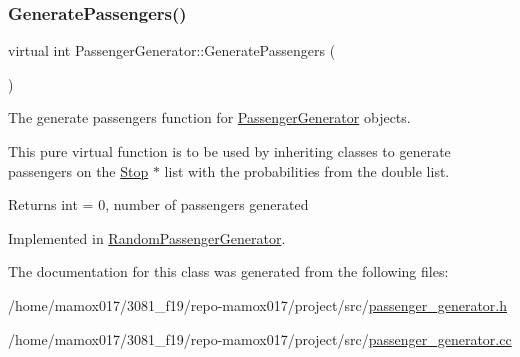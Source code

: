 \subsubsection{\texorpdfstring{Generate\+Passengers()}{GeneratePassengers()}}
{\footnotesize\ttfamily virtual int Passenger\+Generator\+::\+Generate\+Passengers (\begin{DoxyParamCaption}{ }\end{DoxyParamCaption})\hspace{0.3cm}{\ttfamily [pure virtual]}}



The generate passengers function for \hyperlink{classPassengerGenerator}{Passenger\+Generator} objects. 

This pure virtual function is to be used by inheriting classes to generate passengers on the \hyperlink{classStop}{Stop} $\ast$ list with the probabilities from the double list.

\begin{DoxyReturn}{Returns}
int = 0, number of passengers generated 
\end{DoxyReturn}


Implemented in \hyperlink{classRandomPassengerGenerator_aba2d80cde33371cf9c3d033f1b8ba6b8}{Random\+Passenger\+Generator}.



The documentation for this class was generated from the following files\+:\begin{DoxyCompactItemize}
\item 
/home/mamox017/3081\+\_\+f19/repo-\/mamox017/project/src/\hyperlink{passenger__generator_8h}{passenger\+\_\+generator.\+h}\item 
/home/mamox017/3081\+\_\+f19/repo-\/mamox017/project/src/\hyperlink{passenger__generator_8cc}{passenger\+\_\+generator.\+cc}\end{DoxyCompactItemize}

